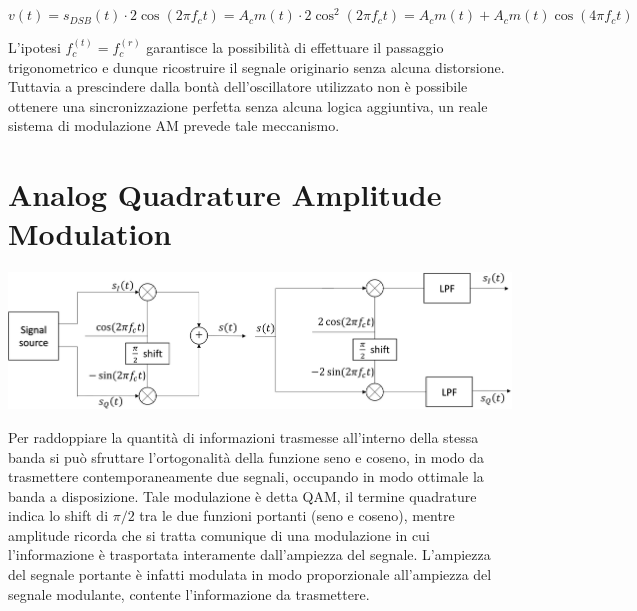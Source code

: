 \begin{equation*}
    v(t) = s_{DSB}(t) \cdot 2\cos(2\pi f_c t) = A_c m(t) \cdot 2\cos^2(2\pi f_c t) = A_c m(t) + A_c m(t) \cos(4\pi f_c t)
\end{equation*}

L'ipotesi $f_c^{(t)} = f_c^{(r)}$ garantisce la possibilità di effettuare il passaggio trigonometrico e dunque ricostruire il segnale originario senza alcuna distorsione. Tuttavia a prescindere dalla bontà dell'oscillatore utilizzato non è possibile ottenere una sincronizzazione perfetta senza alcuna logica aggiuntiva, un reale sistema di modulazione AM prevede tale meccanismo.

\section*{Analog Quadrature Amplitude Modulation}

\begin{center}
    \includegraphics[width=1\textwidth]{imgs/analog_qam.png}
\end{center}

















Per raddoppiare la quantità di informazioni trasmesse all'interno della stessa banda si può sfruttare l'ortogonalità della funzione seno e coseno, in modo da trasmettere contemporaneamente due segnali, occupando in modo ottimale la banda a disposizione. Tale modulazione è detta QAM, il termine quadrature indica lo shift di $\pi/2$ tra le due funzioni portanti (seno e coseno), mentre amplitude ricorda che si tratta comunique di una modulazione in cui l'informazione è trasportata interamente dall'ampiezza del segnale. L'ampiezza del segnale portante è infatti modulata in modo proporzionale all'ampiezza del segnale modulante, contente l'informazione da trasmettere.





